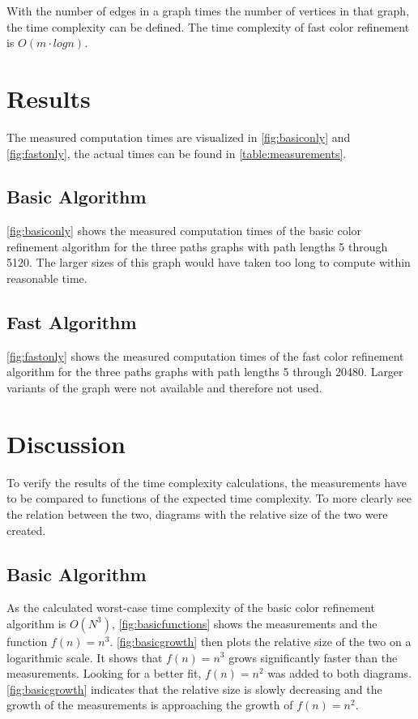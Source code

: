 \documentclass[twoside]{article}
\begin{document}
\begin{multicols}{2}
With the number of edges in a graph times the number of vertices in that graph, the time complexity can be defined.\cite{presentation:slidesPartIII} The time complexity of fast color refinement is $O(m\cdot log n)$. 

\section{Results}
\label{results}
The measured computation times are visualized in \autoref{fig:basiconly} and \autoref{fig:fastonly}, the actual times can be found in \autoref{table:measurements}.

\subsection{Basic Algorithm}
\autoref{fig:basiconly} shows the measured computation times of the basic color refinement algorithm for the three paths graphs with path lengths 5 through 5120. The larger sizes of this graph would have taken too long to compute within reasonable time.

\subsection{Fast Algorithm}
\autoref{fig:fastonly} shows the measured computation times of the fast color refinement algorithm for the three paths graphs with path lengths 5 through 20480. Larger variants of the graph were not available and therefore not used.

\section{Discussion} %
\label{disc}
To verify the results of the time complexity calculations, the measurements have to be compared to functions of the expected time complexity. To more clearly see the relation between the two, diagrams with the relative size of the two were created.

\subsection{Basic Algorithm}
As the calculated worst-case time complexity of the basic color refinement algorithm is $O(N^3)$, \autoref{fig:basicfunctions} shows the measurements and the function $f(n)=n^3$. \autoref{fig:basicgrowth} then plots the relative size of the two on a logarithmic scale. It shows that $f(n)=n^3$ grows significantly faster than the measurements. Looking for a better fit, $f(n)=n^2$ was added to both diagrams. \autoref{fig:basicgrowth} indicates that the relative size is slowly decreasing and the growth of the measurements is approaching the growth of $f(n)=n^2$.


\end{multicols}
\end{document}
